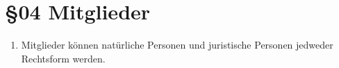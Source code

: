 \section*{§04 Mitglieder}
\begin{enumerate}
\item Mitglieder können natürliche Personen und juristische Personen jedweder
Rechtsform werden.
\end{enumerate}